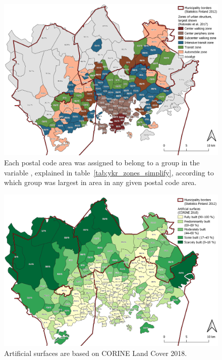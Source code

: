 \begin{figure}
    \centering
    \includegraphics[width=\textwidth]{images/thesis_postalvis_ykrzone.png}
    \caption[Calculated zones of urban structure in the study area]{Each postal code area was assigned to belong to a group in the variable , explained in table~\ref{tab:ykr_zones_simplify}, according to which group was largest in area in any given postal code area.}%
    \label{fig:postalvis_ykrzone}%
\end{figure}

\begin{figure}
    \centering
    \includegraphics[width=\textwidth]{images/thesis_postalvis_artificial.png}
    \caption[Calculated zones of built surfaces in the study area]{Artificial surfaces are based on CORINE Land Cover 2018.}%
    \label{fig:postalvis_artificial}%
\end{figure}
\restoregeometry

